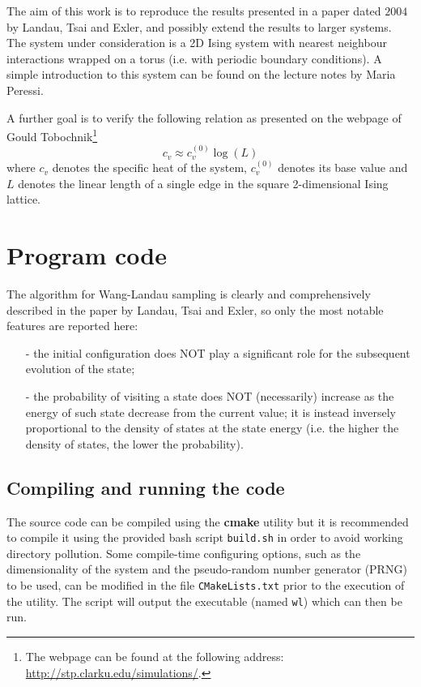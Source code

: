 \documentclass[11pt]{article}
\begin{document}
The aim of this work is to reproduce the results presented in a paper dated $2004$ by Landau, Tsai and Exler\cite{bib:wang_landau}, and possibly extend the results to larger systems. The system under consideration is a 2D Ising system with nearest neighbour interactions wrapped on a torus (i.e. with periodic boundary conditions). A simple introduction to this system can be found on the lecture notes by Maria Peressi\cite{bib:lect_notes}.

A further goal is to verify the following relation as presented on the webpage of Gould Tobochnik\cite{bib:problem}\footnote{The webpage can be found at the following address: \url{http://stp.clarku.edu/simulations/}.}
\[
	c_v \approx c_v^{(0)}\log{(L)}
\]
where $c_v$ denotes the specific heat of the system, $c_v^{(0)}$ denotes its base value and $L$ denotes the linear length of a single edge in the square 2-dimensional Ising lattice.

\section{Program code}

The algorithm for Wang-Landau sampling is clearly and comprehensively described in the paper by Landau, Tsai and Exler\cite{bib:wang_landau}, so only the most notable features are reported here:
\begin{itemize}
	\item[-] the initial configuration does NOT play a significant role for the subsequent evolution of the state;
	\item[-] the probability of visiting a state does NOT (necessarily) increase as the energy of such state decrease from the current value; it is instead inversely proportional to the density of states at the state energy (i.e. the higher the density of states, the lower the probability).
	
\end{itemize}


\subsection{Compiling and running the code}

The source code can be compiled using the {\bf cmake} utility but it is recommended to compile it using the provided bash script \verb|build.sh| in order to avoid working directory pollution.
Some compile-time configuring options, such as the dimensionality of the system and the pseudo-random number generator (PRNG) to be used, can be modified in the file \verb|CMakeLists.txt| prior to the execution of the utility.
The script will output the executable (named \verb|wl|) which can then be run.
\end{document}
